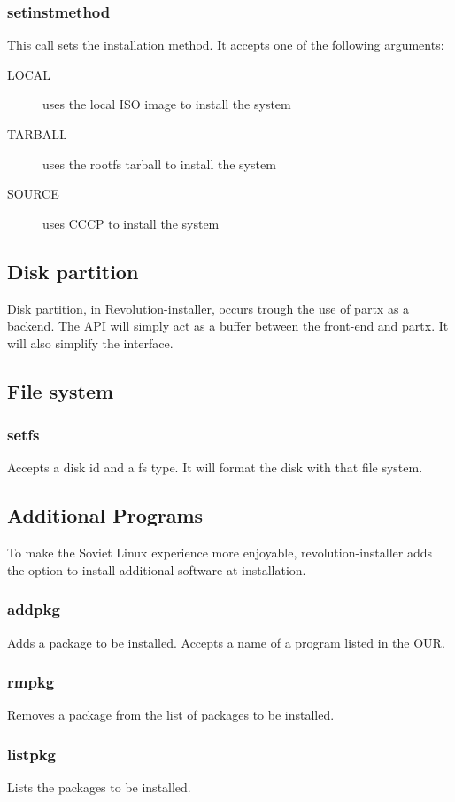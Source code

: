 \documentclass{scrartcl}
\begin{document}
\subsubsection{setinstmethod}
This call sets the installation method. It accepts one of the following
arguments:
\begin{description}
    \item[LOCAL] uses the local ISO image to install the system
    \item[TARBALL] uses the rootfs tarball to install the system
    \item[SOURCE] uses CCCP to install the system
\end{description}

\subsection{Disk partition}
Disk partition, in Revolution-installer, occurs trough the use of partx as a
backend. The API will simply act as a buffer between the front-end and partx.
It will also simplify the interface.

\subsection{File system}
\subsubsection{setfs}
Accepts a disk id and a fs type. It will format the disk with that file system.

\subsection{Additional Programs}
To make the Soviet Linux experience more enjoyable, revolution-installer adds
the option to install additional software at installation.
\subsubsection{addpkg}
Adds a package to be installed. Accepts a name of a program listed in the OUR.
\subsubsection{rmpkg}
Removes a package from the list of packages to be installed.
\subsubsection{listpkg}
Lists the packages to be installed.
\end{document}
